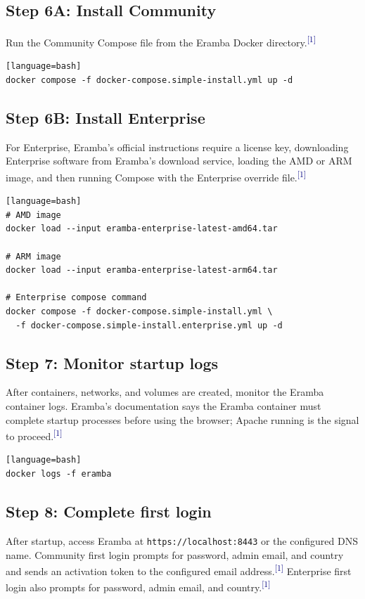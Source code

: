 \documentclass[10pt,letterpaper]{article}
\newcommand{\source}[1]{\textsuperscript{\textcolor{navy}{#1}}}
\begin{document}
\subsection{Step 6A: Install Community}
Run the Community Compose file from the Eramba Docker directory.\source{[1]}

\begin{verbatim}[language=bash]
docker compose -f docker-compose.simple-install.yml up -d
\end{verbatim}

\subsection{Step 6B: Install Enterprise}
For Enterprise, Eramba's official instructions require a license key, downloading Enterprise software from Eramba's download service, loading the AMD or ARM image, and then running Compose with the Enterprise override file.\source{[1]}

\begin{verbatim}[language=bash]
# AMD image
docker load --input eramba-enterprise-latest-amd64.tar

# ARM image
docker load --input eramba-enterprise-latest-arm64.tar

# Enterprise compose command
docker compose -f docker-compose.simple-install.yml \
  -f docker-compose.simple-install.enterprise.yml up -d
\end{verbatim}

\subsection{Step 7: Monitor startup logs}
After containers, networks, and volumes are created, monitor the Eramba container logs. Eramba's documentation says the Eramba container must complete startup processes before using the browser; Apache running is the signal to proceed.\source{[1]}

\begin{verbatim}[language=bash]
docker logs -f eramba
\end{verbatim}

\subsection{Step 8: Complete first login}
After startup, access Eramba at \texttt{https://localhost:8443} or the configured DNS name. Community first login prompts for password, admin email, and country and sends an activation token to the configured email address.\source{[1]} Enterprise first login also prompts for password, admin email, and country.\source{[1]}
\end{document}
